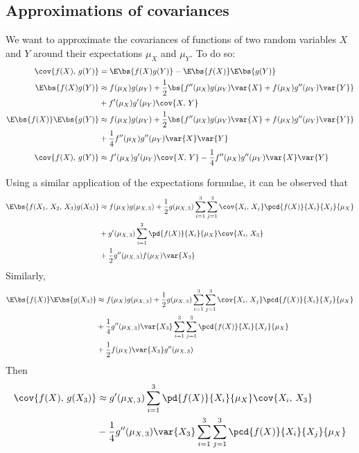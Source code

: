 \subsection{Approximations of covariances}\label{app:covariances}

We want to approximate the covariances of functions of two random variables $X$ and $Y$ around their expectations $\mu_X$ and $\mu_Y$. To do so:
\begin{align*}
    \cov{f(X),\,g(Y)} &= \E\bs{f(X)g(Y)} - \E\bs{f(X)}\E\bs{g(Y)}\\
    \E\bs{f(X)g(Y)} &\approx f(\mu_X)g(\mu_Y) + \frac{1}{2}\bs{f''(\mu_X)g(\mu_Y)\var{X} + f(\mu_X)g''(\mu_Y)\var{Y}} \\&+ f'(\mu_X)g'(\mu_Y)\cov{X,\,Y}\\
    \E\bs{f(X)}\E\bs{g(Y)} &\approx f(\mu_X)g(\mu_Y) + \frac{1}{2}\bs{f''(\mu_X)g(\mu_Y)\var{X} + f(\mu_X)g''(\mu_Y)\var{Y}} \\&+ \frac{1}{4}f''(\mu_X)g''(\mu_Y)\var{X}\var{Y}\\
    \cov{f(X),\,g(Y)} &\approx f'(\mu_X)g'(\mu_Y)\cov{X,\,Y} - \frac{1}{4}f''(\mu_X)g''(\mu_Y)\var{X}\var{Y}
\end{align*}

Using a similar application of the expectations formulae, it can be observed that
\begin{align*}
    \E\bs{f(X_1,\,X_2,\,X_3)g(X_3)} &\approx f(\mu_X)g(\mu_{X,\,3}) + \frac{1}{2}g(\mu_{X,\,3})\sum_{i=1}^{3}\sum_{j=1}^{3}\cov{X_i,\,X_j}\pcd{f(X)}{X_i}{X_j}{\mu_X}\\ &+ g'(\mu_{X,\,3})\sum_{i=1}^{3}\pd{f(X)}{X_i}{\mu_X}\cov{X_i,\,X_3}\\
    &+ \frac{1}{2}g''(\mu_{X,\,3})f(\mu_X)\var{X_3}
\end{align*}
Similarly,
\begin{align*}
    \E\bs{f(X)}\E\bs{g(X_3)} &\approx f(\mu_X)g(\mu_{X,\,3}) + \frac{1}{2}g(\mu_{X,\,3})\sum_{i=1}^{3}\sum_{j=1}^{3}\cov{X_i,\,X_j}\pcd{f(X)}{X_i}{X_j}{\mu_X}\\ &+ \frac{1}{4}g''(\mu_{X,\,3})\var{X_3}\sum_{i=1}^{3}\sum_{j=1}^{3}\pcd{f(X)}{X_i}{X_j}{\mu_X}\\
    &+ \frac{1}{2}f(\mu_X)\var{X_3}g''(\mu_{X,\,3})
\end{align*}
Then
\begin{align*}
    \cov{f(X),\,g(X_3)} &\approx g'(\mu_{X,\,3})\sum_{i=1}^{3}\pd{f(X)}{X_i}{\mu_X}\cov{X_i,\,X_3}\\ &- \frac{1}{4}g''(\mu_{X,\,3})\var{X_3}\sum_{i=1}^{3}\sum_{j=1}^{3}\pcd{f(X)}{X_i}{X_j}{\mu_X}
\end{align*}